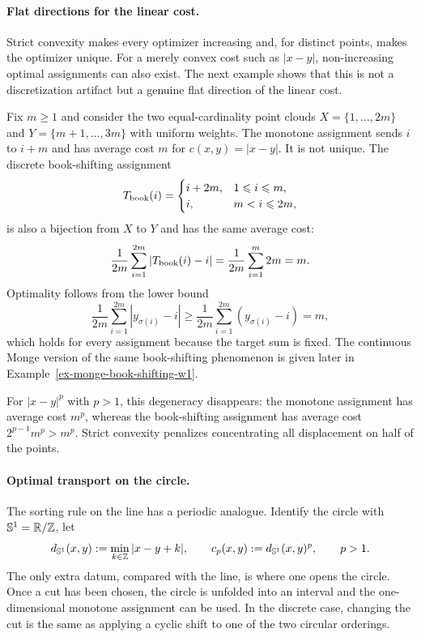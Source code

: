 \paragraph{Flat directions for the linear cost.}
Strict convexity makes every optimizer increasing and, for distinct points, makes the optimizer unique. For a merely convex cost such as $|x-y|$, non-increasing optimal assignments can also exist. The next example shows that this is not a discretization artifact but a genuine flat direction of the linear cost.

\begin{example}\label{ex-book-shifting-w1}
		Fix $m\geq1$ and consider the two equal-cardinality point clouds
		$X=\{1,\ldots,2m\}$ and $Y=\{m+1,\ldots,3m\}$ with uniform weights.
		The monotone assignment sends $i$ to $i+m$ and has average cost $m$ for $c(x,y)=|x-y|$. It is not unique. The discrete book-shifting assignment
	\[
		T_{\rm book}(i)=
		\begin{cases}
			i+2m, & 1\leq i\leq m,\\
			i, & m<i\leq 2m,
		\end{cases}
	\]
	is also a bijection from $X$ to $Y$ and has the same average cost:
	\[
		\frac1{2m}\sum_{i=1}^{2m}|T_{\rm book}(i)-i|
		=
		\frac1{2m}\sum_{i=1}^{m}2m
		=m.
	\]
	Optimality follows from the lower bound
	\[
		\frac1{2m}\sum_{i=1}^{2m}|y_{\sigma(i)}-i|
		\geq
		\frac1{2m}\sum_{i=1}^{2m}(y_{\sigma(i)}-i)
		=m,
	\]
	which holds for every assignment because the target sum is fixed. The continuous Monge version of the same book-shifting phenomenon is given later in Example~\ref{ex-monge-book-shifting-w1}.

	For $|x-y|^p$ with $p>1$, this degeneracy disappears: the monotone assignment has average cost $m^p$, whereas the book-shifting assignment has average cost $2^{p-1}m^p>m^p$. Strict convexity penalizes concentrating all displacement on half of the points.
\end{example}

\paragraph{Optimal transport on the circle.}\label{rem-circle-ot-cut}

The sorting rule on the line has a periodic analogue. Identify the circle with $\mathbb S^1=\RR/\ZZ$, let
\[
	d_{\mathbb S^1}(x,y):=\min_{k\in\ZZ}|x-y+k|,
	\qquad
	c_p(x,y):=d_{\mathbb S^1}(x,y)^p,\qquad p>1.
\]
The only extra datum, compared with the line, is where one opens the circle. Once a cut has been chosen, the circle is unfolded into an interval and the one-dimensional monotone assignment can be used. In the discrete case, changing the cut is the same as applying a cyclic shift to one of the two circular orderings.

